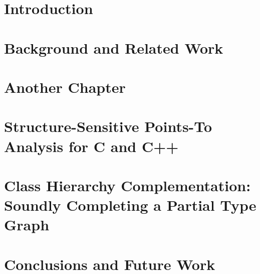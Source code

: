\documentclass[inscr,ack,preface]{diphdthesis}
\begin{document}

\frontmatter



\mainmatter

\chapter{Introduction}

\cite{pldi/KastrinisS13}
\cite{structsens}

\chapter{Background and Related Work}
\chapter{Another Chapter}

\chapter{Structure-Sensitive Points-To Analysis for C and C++}


\chapter{Class Hierarchy Complementation: Soundly Completing a Partial
  Type Graph}


\chapter{Conclusions and Future Work}



\end{document}
